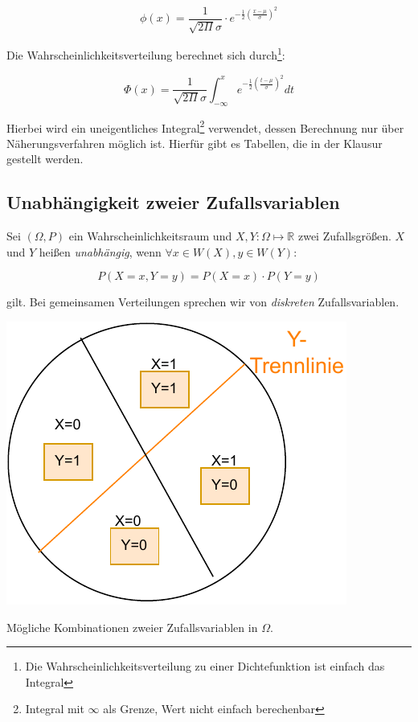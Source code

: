 \documentclass{tufte-handout}
\theoremstyle{own}
\begin{document}
\begin{equation}
\phi(x) = \frac{1}{\sqrt{2 \Pi} \sigma} \cdot e^{- \frac{1}{2} (\frac{x - \mu}{\sigma})^2}
\end{equation}

Die Wahrscheinlichkeitsverteilung berechnet sich durch\footnote{Die Wahrscheinlichkeitsverteilung zu einer Dichtefunktion ist einfach das Integral}:

\begin{equation}
\Phi(x) = \frac{1}{\sqrt{2 \Pi} \sigma} \int_{-\infty}^x e^{- \frac{1}{2} (\frac{t - \mu}{\sigma})^2} dt
\end{equation}

Hierbei wird ein uneigentliches Integral\footnote{Integral mit $\infty$ als Grenze, Wert nicht einfach berechenbar} verwendet, dessen Berechnung nur über Näherungsverfahren möglich ist. 
Hierfür gibt es Tabellen, die in der Klausur gestellt werden.

\subsection{Unabhängigkeit zweier Zufallsvariablen}

Sei $(\Omega, P)$ ein Wahrscheinlichkeitsraum und $X,Y : \Omega \mapsto \mathbb{R}$ zwei Zufallsgrößen.
$X$ und $Y$ heißen \textit{unabhängig}, wenn $\forall x \in W(X), y \in W(Y)$:

\begin{equation}
	P(X=x, Y=y) = P(X=x) \cdot P(Y=y)
\end{equation}

gilt. Bei gemeinsamen Verteilungen sprechen wir von \textit{diskreten} Zufallsvariablen.

\begin{marginfigure}
  \includegraphics{zweizufallsvariablen}
  \caption{Mögliche Kombinationen zweier Zufallsvariablen in $\Omega$.}
\end{marginfigure}
\end{document}
